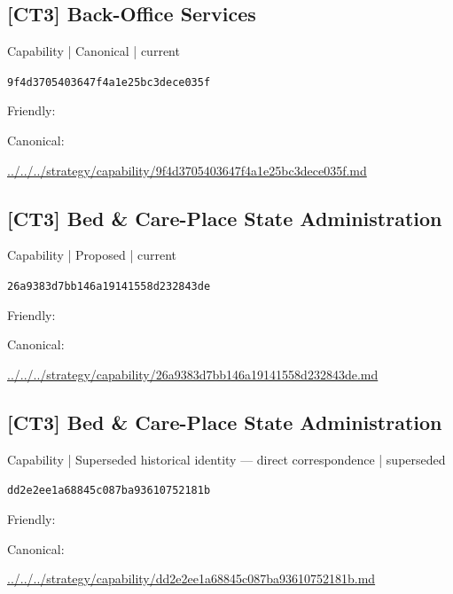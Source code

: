 \documentclass[10pt,a4paper]{article}
\begin{document}
\subsection*{[CT3] Back-Office Services}
{\small Capability | Canonical | current}\par
\texttt{9f4d3705403647f4a1e25bc3dece035f}\par
Friendly: \par
Canonical: \par
{\footnotesize\url{../../../strategy/capability/9f4d3705403647f4a1e25bc3dece035f.md}}\par
\subsection*{[CT3] Bed \& Care-Place State Administration}
{\small Capability | Proposed | current}\par
\texttt{26a9383d7bb146a19141558d232843de}\par
Friendly: \par
Canonical: \par
{\footnotesize\url{../../../strategy/capability/26a9383d7bb146a19141558d232843de.md}}\par
\subsection*{[CT3] Bed \& Care-Place State Administration}
{\small Capability | Superseded historical identity — direct correspondence | superseded}\par
\texttt{dd2e2ee1a68845c087ba93610752181b}\par
Friendly: \par
Canonical: \par
{\footnotesize\url{../../../strategy/capability/dd2e2ee1a68845c087ba93610752181b.md}}\par
\end{document}
